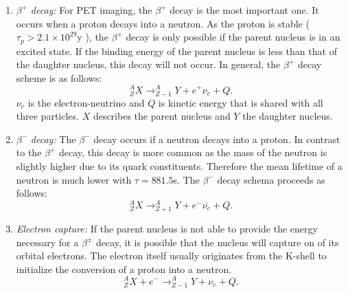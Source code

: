 \begin{enumerate}
\item $\beta^+$ \textit{decay: }For PET imaging, the $\beta^+$ decay is the most important one. It occurs when a proton decays into a neutron. As the proton is stable ($\tau_p > 2.1 \times 10^{29}$y \cite{PDG}), the $\beta^+$ decay is only possible if the parent nucleus is in an excited state. If the binding energy of the parent nucleus is less than that of the daughter nucleus, this decay will not occur. In general, the $\beta^+$ decay scheme is as follows:
\begin{equation}
^A_ZX\rightarrow ^A_{Z-1}Y + e^+ \nu_e + Q.
\end{equation}
$\nu_e$ is the electron-neutrino and $Q$ is kinetic energy that is shared with all three particles. $X$ describes the parent nucleus and $Y$ the daughter nucleus.
\item $\beta^-$ \textit{decay: }The $\beta^-$ decay occurs if a neutron decays into a proton. In contrast to the $\beta^+$ decay, this decay is more common as the mass of the neutron is slightly higher due to its quark constituents. Therefore the mean lifetime of a neutron is much lower with $\tau = 881.5$s\cite{PDG}. The $\beta^-$ decay schema proceeds as follows:
\begin{equation}
^A_ZX\rightarrow ^A_{Z+1}Y + e^- \overline{\nu_e} + Q.
\end{equation}
\item \textit{Electron capture: }If the parent nucleus is not able to provide the energy necessary for a $\beta^\pm$ decay, it is possible that the nucleus will capture on of its orbital electrons. The electron itself usually originates from the K-shell to initialize the conversion of a proton into a neutron.
\begin{equation}
^A_ZX + e^-\rightarrow ^A_{Z-1}Y + \nu_e + Q.
\end{equation}
\end{enumerate}
